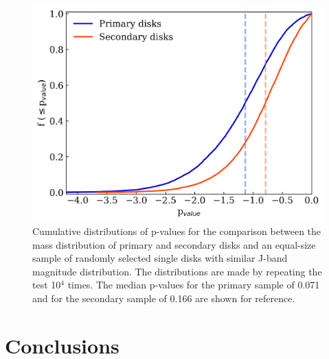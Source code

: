 \documentclass{aa}
\begin{document}
\begin{figure}
\centering
   \includegraphics[width=\columnwidth]{p_value_cumulative.png}
     \caption{Cumulative distributions of p-values for the comparison between the mass distribution of primary and secondary disks and an equal-size sample of randomly selected single disks with similar J-band magnitude distribution. The distributions are made by repeating the test 10$^4$ times. The median p-values for the primary sample of 0.071 and for the secondary sample of 0.166 are shown for reference.}
     \label{figure:pvaluetest}
\end{figure}


\section{Conclusions} \label{section5}
\end{document}
